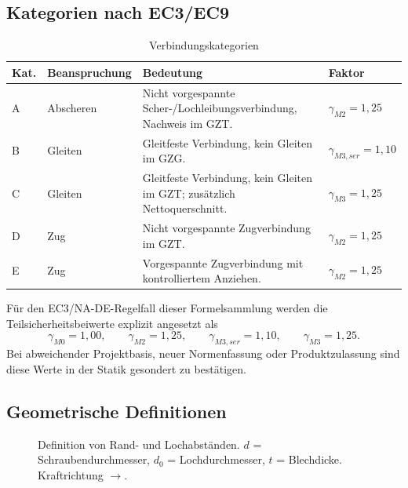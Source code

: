 \documentclass[10pt,a4paper]{article}
\newcommand{\gamMtwo}{\gamma_{M2}}
\newcommand{\gamMthree}{\gamma_{M3}}
\begin{document}
\subsection{Kategorien nach EC3/EC9}
\begin{table}[H]
\centering
\caption{Verbindungskategorien}
\begin{tabularx}{\textwidth}{@{}p{16mm}p{34mm}Yp{28mm}@{}}
\toprule
\textbf{Kat.} & \textbf{Beanspruchung} & \textbf{Bedeutung} & \textbf{Faktor} \\
\midrule
A & Abscheren & Nicht vorgespannte Scher-/Lochleibungsverbindung, Nachweis im GZT. & $\gamMtwo=1{,}25$ \\
B & Gleiten & Gleitfeste Verbindung, kein Gleiten im GZG. & $\gamma_{M3,ser}=1{,}10$ \\
C & Gleiten & Gleitfeste Verbindung, kein Gleiten im GZT; zusätzlich Nettoquerschnitt. & $\gamMthree=1{,}25$ \\
D & Zug & Nicht vorgespannte Zugverbindung im GZT. & $\gamMtwo=1{,}25$ \\
E & Zug & Vorgespannte Zugverbindung mit kontrolliertem Anziehen. & $\gamMtwo=1{,}25$ \\
\bottomrule
\end{tabularx}
\end{table}

\begin{normbox}
Für den EC3/NA-DE-Regelfall dieser Formelsammlung werden die Teilsicherheitsbeiwerte explizit angesetzt als
\[
\gamma_{M0}=1{,}00,\qquad \gamma_{M2}=1{,}25,\qquad \gamma_{M3,ser}=1{,}10,\qquad \gamma_{M3}=1{,}25.
\]
Bei abweichender Projektbasis, neuer Normenfassung oder Produktzulassung sind diese Werte in der Statik gesondert zu bestätigen.
\end{normbox}

\subsection{Geometrische Definitionen}
\begin{figure}[H]
\centering
{}
\caption{Definition von Rand- und Lochabständen. $d$ = Schraubendurchmesser, $d_0$ = Lochdurchmesser, $t$ = Blechdicke. Kraft\-richtung $\rightarrow$.}
\end{figure}
\end{document}
